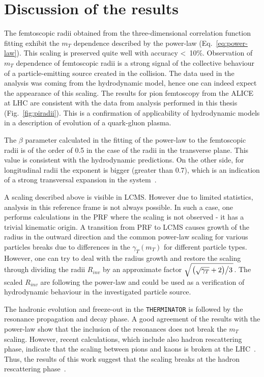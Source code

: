 

      \FloatBarrier
  \section{Discussion of the results}
    The femtoscopic radii obtained from the three-dimensional correlation function fitting exhibit the $m_T$ dependence described by the power-law (Eq.~\ref{eq:power-law}).
    This scaling is preserved quite well with accuracy <~10\%.
    Observation of $m_T$ dependence of femtoscopic radii is a strong signal of the collective behaviour of a particle-emitting source created in the collision.
    The data used in the analysis was coming from the hydrodynamic model, hence one can indeed expect the appearance of this scaling.
    The results for pion femtoscopy from the ALICE at LHC are consistent with the data from analysis performed in this thesis (Fig.~\ref{fig:piradii}).
    This is a confirmation of applicability of hydrodynamic models in a description of evolution of a quark-gluon plasma.

    The $\beta$ parameter calculated in the fitting of the power-law to the femtoscopic radii is of the order of 0.5 in the case of the radii in the transverse plane.
    This value is consistent with the hydrodynamic predictions.
    On the other side, for longitudinal radii the exponent is bigger (greater than 0.7), which is an indication of a strong transversal expansion in the system~\cite{akkelin_sinyukov}.

    A scaling described above is visible in LCMS.
    However due to limited statistics, analysis in this reference frame is not always possible.
    In such a case, one performs calculations in the PRF where the scaling is not observed - it has a trivial kinematic origin.
    A transition from PRF to LCMS causes growth of the radius in the outward direction and the common power-law scaling for various particles breaks due to differences in the $\gamma_T (m_T)$ for different particle types.
    However, one can try to deal with the radius growth and restore the scaling through dividing the radii $R_{inv}$ by an approximate factor $\sqrt{ \left. \left( \sqrt{\gamma_T} + 2 \right) \middle/ 3 \right. }$.
    The scaled $R_{inv}$ are following the power-law and could be used as a verification of hydrodynamic behaviour in the investigated particle source.

    The hadronic evolution and freeze-out in the \verb|THERMINATOR| is followed by the resonance propagation and decay phase.
    A good agreement of the results with the power-law show that the inclusion of the resonances does not break the $m_T$ scaling.
    However, recent calculations, which include also hadron rescattering phase, indicate that the scaling between pions and kaons is broken at the LHC~\cite{sinyukov_kaon}.
    Thus, the results of this work suggest that the scaling breaks at the hadron rescattering phase~\cite{galazyn}.
